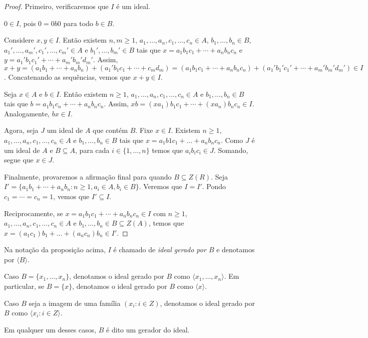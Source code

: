 \begin{proof}
    Primeiro, verificaremos que $I$ é um ideal.

    $0 \in I$, pois $0=0b0$ para todo $b \in B$.

    Considere $x, y \in I$.
    Então existem $n, m\geq 1$, $a_1, \dots, a_n, c_1, \dots, c_n \in A$, $b_1, \dots, b_n \in B$, $a_1', \dots, a_m', c_1', \dots, c_m' \in A$ e $b_1', \dots, b_m' \in B$ tais que $x=a_1b_1c_1+\cdots+a_nb_nc_n$ e $y=a_1'b_1c_1'+\cdots+a_m'b_m'd_m'$.
    Assim, $x+y=(a_1b_1+\cdots+a_nb_n)+(a_1'b_1c_1+\cdots+c_md_m)=(a_1b_1c_1+\cdots+a_nb_nc_n)+(a_1'b_1'c_1'+\cdots+a_m'b_m'd_m') \in I$.
    Concatenando as sequências, vemos que $x+y\in I$.

    Seja $x \in A$ e $b \in I$.
    Então existem $n\geq 1$, $a_1, \dots, a_n, c_1, \dots, c_n \in A$ e $b_1, \dots, b_n \in B$ tais que $b=a_1b_1c_n+\cdots+a_nb_nc_n$. Assim, $xb=(xa_1)b_1c_1+\cdots+(xa_n)b_nc_n\in I$.
    Analogamente, $bx \in I$.

    Agora, seja $J$ um ideal de $A$ que contém $B$.
    Fixe $x \in I$.
    Existem $n\geq 1$, $a_1, \dots, a_n, c_1, \dots, c_n\in A$ e $b_1, \dots, b_n \in B$ tais que $x=a_1b1c_1+\dots+a_nb_nc_n$.
    Como $J$ é um ideal de $A$ e $B\subseteq A$, para cada $i \in \{1, \dots, n\}$ temos que $a_ib_ic_i \in J$.
    Somando, segue que $x \in J$.

    Finalmente, provaremos a afirmação final para quando $B\subseteq Z(R)$. Seja $I'=\{a_1b_1+\cdots+a_nb_n: n\geq 1, a_i \in A, b_i \in B\}$.
    Veremos que $I=I'$.
    Pondo $c_1=\cdots=c_n=1$, vemos que $I'\subseteq I$.

    Reciprocamente, se $x=a_1b_1c_1+\cdots+a_nb_nc_n \in I$ com $n\geq 1$, $a_1,\dots, a_n, c_1, \dots, c_n \in A$ e $b_1, \dots, b_n \in B\subseteq Z(A)$, temos que $x=(a_1c_1)b_1+\dots+(a_nc_n)b_n\in I'$.
\end{proof}


\begin{definition}
    Na notação da proposição acima, $I$ é chamado de \emph{ideal gerado por $B$} e denotamos por $\langle B \rangle$. 
    
    Caso $B=\{x_1, \dots, x_n\}$, denotamos o ideal gerado por $B$ como $\langle x_1, \dots, x_n \rangle$.
    Em particular, se $B=\{x\}$, denotamos o ideal gerado por $B$ como $\langle x \rangle$.
    
    Caso $B$ seja a imagem de uma família $(x_i: i \in Z)$, denotamos o ideal gerado por $B$ como $\langle x_i: i \in Z \rangle$. 

    Em qualquer um desses casos, $B$ é dito um gerador do ideal.
\end{definition}

